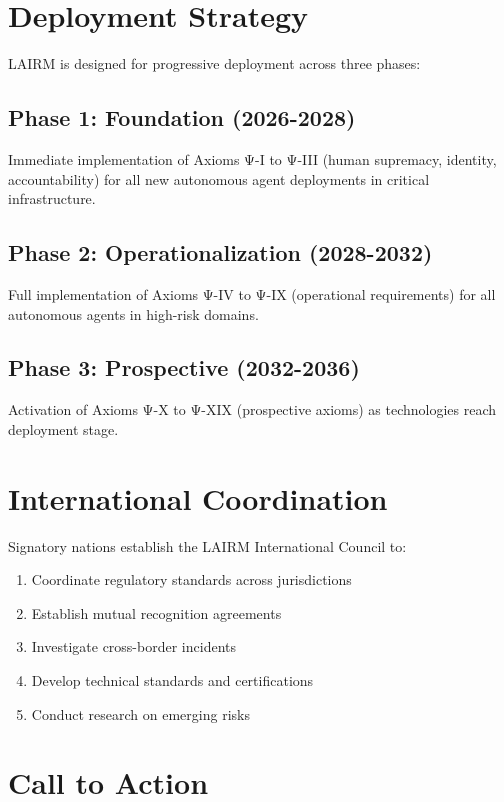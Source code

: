 \documentclass[12pt,a4paper,twoside,openright]{book}
\begin{document}
\section{Deployment Strategy}

LAIRM is designed for progressive deployment across three phases:

\subsection{Phase 1: Foundation (2026-2028)}

Immediate implementation of Axioms Ψ-I to Ψ-III (human supremacy, identity, accountability) for all new autonomous agent deployments in critical infrastructure.

\subsection{Phase 2: Operationalization (2028-2032)}

Full implementation of Axioms Ψ-IV to Ψ-IX (operational requirements) for all autonomous agents in high-risk domains.

\subsection{Phase 3: Prospective (2032-2036)}

Activation of Axioms Ψ-X to Ψ-XIX (prospective axioms) as technologies reach deployment stage.

\section{International Coordination}

Signatory nations establish the LAIRM International Council to:

\begin{enumerate}
    \item Coordinate regulatory standards across jurisdictions
    \item Establish mutual recognition agreements
    \item Investigate cross-border incidents
    \item Develop technical standards and certifications
    \item Conduct research on emerging risks
\end{enumerate}

\section{Call to Action}
\end{document}
